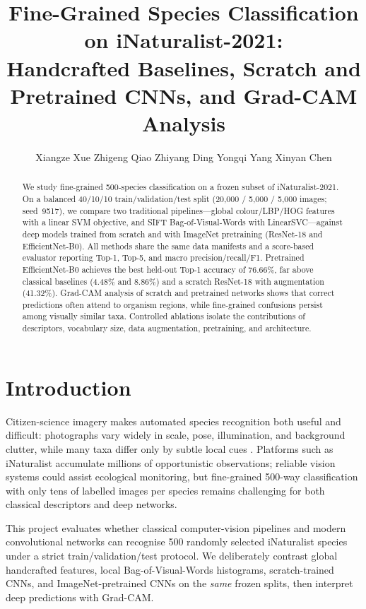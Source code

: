 \documentclass[10pt,twocolumn,letterpaper]{article}
\title{Fine-Grained Species Classification on iNaturalist-2021:\\
Handcrafted Baselines, Scratch and Pretrained CNNs, and Grad-CAM Analysis}
\author{
Xiangze Xue \quad
Zhigeng Qiao \quad
Zhiyang Ding \quad
Yongqi Yang \quad
Xinyan Chen
}
\begin{document}
\maketitle

\begin{abstract}
We study fine-grained 500-species classification on a frozen subset of
iNaturalist-2021. On a balanced 40/10/10 train/validation/test split
(20{,}000 / 5{,}000 / 5{,}000 images; seed~9517), we compare two traditional
pipelines---global colour/LBP/HOG features with a linear SVM objective, and
SIFT Bag-of-Visual-Words with LinearSVC---against deep models trained from
scratch and with ImageNet pretraining (ResNet-18 and EfficientNet-B0). All
methods share the same data manifests and a score-based evaluator reporting
Top-1, Top-5, and macro precision/recall/F1. Pretrained EfficientNet-B0
achieves the best held-out Top-1 accuracy of 76.66\%, far above classical
baselines (4.48\% and 8.86\%) and a scratch ResNet-18 with augmentation
(41.32\%). Grad-CAM analysis of scratch and pretrained networks shows that
correct predictions often attend to organism regions, while fine-grained
confusions persist among visually similar taxa. Controlled ablations isolate
the contributions of descriptors, vocabulary size, data augmentation,
pretraining, and architecture.
\end{abstract}

\section{Introduction}

Citizen-science imagery makes automated species recognition both useful and
difficult: photographs vary widely in scale, pose, illumination, and
background clutter, while many taxa differ only by subtle local cues
\cite{vanhorn2018inaturalist,vanhorn2021benchmarking}. Platforms such as
iNaturalist accumulate millions of opportunistic observations; reliable
vision systems could assist ecological monitoring, but fine-grained 500-way
classification with only tens of labelled images per species remains
challenging for both classical descriptors and deep networks.

This project evaluates whether classical computer-vision pipelines and modern
convolutional networks can recognise 500 randomly selected iNaturalist
species under a strict train/validation/test protocol. We deliberately
contrast global handcrafted features, local Bag-of-Visual-Words histograms,
scratch-trained CNNs, and ImageNet-pretrained CNNs on the \emph{same} frozen
splits, then interpret deep predictions with Grad-CAM.
\end{document}
